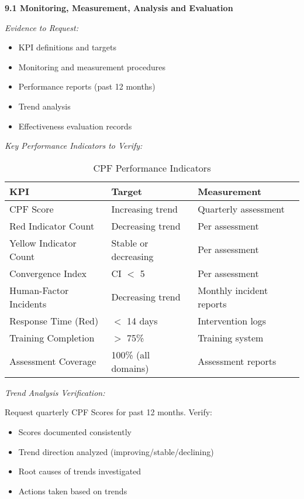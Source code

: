 \documentclass[11pt,a4paper]{article}
\begin{document}
\textbf{9.1 Monitoring, Measurement, Analysis and Evaluation}

\textit{Evidence to Request:}
\begin{itemize}
\item KPI definitions and targets
\item Monitoring and measurement procedures
\item Performance reports (past 12 months)
\item Trend analysis
\item Effectiveness evaluation records
\end{itemize}

\textit{Key Performance Indicators to Verify:}

\begin{table}[h]
\centering
\caption{CPF Performance Indicators}
\small
\begin{tabular}{lll}
\toprule
\textbf{KPI} & \textbf{Target} & \textbf{Measurement} \\
\midrule
CPF Score & Increasing trend & Quarterly assessment \\
Red Indicator Count & Decreasing trend & Per assessment \\
Yellow Indicator Count & Stable or decreasing & Per assessment \\
Convergence Index & CI $<$ 5 & Per assessment \\
Human-Factor Incidents & Decreasing trend & Monthly incident reports \\
Response Time (Red) & $<$ 14 days & Intervention logs \\
Training Completion & $>$ 75\% & Training system \\
Assessment Coverage & 100\% (all domains) & Assessment reports \\
\bottomrule
\end{tabular}
\end{table}

\textit{Trend Analysis Verification:}

Request quarterly CPF Scores for past 12 months. Verify:
\begin{itemize}
\item Scores documented consistently
\item Trend direction analyzed (improving/stable/declining)
\item Root causes of trends investigated
\item Actions taken based on trends
\end{itemize}
\end{document}
